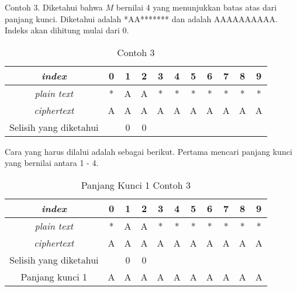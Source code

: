 		
	Contoh 3. Diketahui bahwa $M$ bernilai 4 yang menunjukkan batas atas dari panjang kunci. Diketahui \plaintext adalah *AA******* dan \ciphertext adalah AAAAAAAAAA. Indeks akan dihitung mulai dari 0. 
	 \begin{table}[H]
	 	\centering
	 	\caption{Contoh 3}
	 	\begin{tabular}{|c|c|c|c|c|c|c|c|c|c|c|}\hline
	 	\textit{index}&0&1&2&3&4&5&6&7&8&9\\ \hline
	 	\textit{plain text}&*&A&A&*&*&*&*&*&*&*\\ \hline
	 	\textit{ciphertext}&A&A&A&A&A&A&A&A&A&A\\ \hline
		Selisih yang diketahui & &0&0& & & & & & & \\ \hline	 	
	 	\end{tabular}
	 	\label{tab:contoh3}
	\end{table}
	
	Cara yang harus dilalui adalah sebagai berikut. Pertama mencari panjang kunci yang bernilai antara 1 - 4. \\
	
	\begin{table}[H]
	 	\centering
	 	\caption{Panjang Kunci 1 Contoh 3}
	 	\setlength{\arrayrulewidth}{.08em}
	 	\begin{tabular}{|c|c|c|c|c|c|c|c|c|c|c|}\hline
	 	\textit{index}&0&1&2&3&4&5&6&7&8&9\\ \hline
	 	\textit{plain text}&\cellcolor{blue!15}*&\cellcolor{yellow!25}A&\cellcolor{green!15}A&\cellcolor{lime!25}*&\cellcolor{pink!30}*&\cellcolor{red!15}*&\cellcolor{violet!30}*&\cellcolor{magenta!15}*&\cellcolor{purple!25}*&\cellcolor{teal!35}*\\ \hline
	 	\textit{ciphertext}&\cellcolor{blue!15}A&\cellcolor{yellow!25}A&\cellcolor{green!15}A&\cellcolor{lime!25}A&\cellcolor{pink!30}A&\cellcolor{red!15}A&\cellcolor{violet!30}A&\cellcolor{magenta!15}A&\cellcolor{purple!25}A&\cellcolor{teal!35}A\\ \hline
		Selisih yang diketahui & &0&0& & & & & & & \\ \hline	
		Panjang kunci 1 &A&A&A&A&A&A&A&A&A&A\\ \hline 	
	 	\end{tabular}
	 	\label{tab:k1contoh3}
	\end{table}
	
